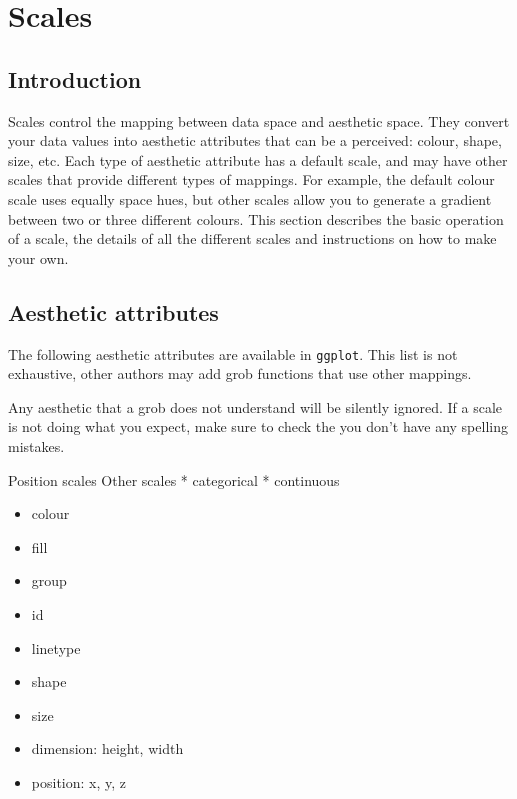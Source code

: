 


\chapter{Scales}

\section{Introduction}\label{sec:introduction}

Scales control the mapping between data space and aesthetic space.  They convert your data values into aesthetic attributes that can be a perceived: colour, shape, size, etc.  Each type of aesthetic attribute has a default scale, and may have other scales that provide different types of mappings.  For example, the default colour scale uses equally space hues, but other scales allow you to generate a gradient between two or three different colours.  This section describes the basic operation of a scale, the details of all the different scales and instructions on how to make your own.


\section{Aesthetic attributes}\label{sec:aesthetic_attributes}

The following aesthetic attributes are available in {\tt ggplot}.  This list is not exhaustive, other authors may add grob functions that use other mappings.  

Any aesthetic that a grob does not understand will be silently ignored.  If a scale is not doing what you expect, make sure to check the you don't have any spelling mistakes.

Position scales
Other scales
 * categorical
 * continuous

\begin{itemize}
	\item colour
	\item fill
	\item group
	\item id
	\item linetype
	\item shape
	\item size
	\item dimension: height, width
	\item position: x, y, z
\end{itemize}

